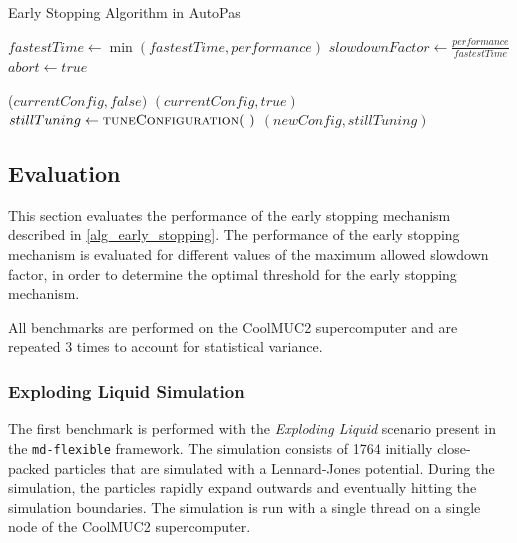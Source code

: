 \documentclass[conference]{IEEEtran}
\begin{document}
\begin{algorithm}[H]
    \small
    \caption{Early Stopping Algorithm in AutoPas}
    \label{alg_early_stopping}
    \begin{algorithmic}[1]
        \State $fastestTime \gets \min(fastestTime, performance)$
        \State $slowdownFactor \gets \frac{performance}{fastestTime}$
        \State $abort \gets true$
        \EndIf
        \EndProcedure

        \vspace{0.5em}

        \State \Return ($currentConfig, false)$
            \State \Return $(currentConfig, true)$
            \Else
            \State $stillTuning \gets \Call{tuneConfiguration}{~}$
            \State \Return $(newConfig, stillTuning)$
        \EndIf
        \EndProcedure
    \end{algorithmic}

\end{algorithm}



\subsection{Evaluation}
\label{sec:evaluation}

This section evaluates the performance of the early stopping mechanism described in \autoref{alg_early_stopping}. The performance of the early stopping mechanism is evaluated for different values of the maximum allowed slowdown factor, in order to determine the optimal threshold for the early stopping mechanism.

All benchmarks are performed on the CoolMUC2 supercomputer  and are repeated 3 times to account for statistical variance.

\subsubsection{Exploding Liquid Simulation}

The first benchmark is performed with the \textit{Exploding Liquid} scenario present in the \texttt{md-flexible} framework. The simulation consists of 1764 initially close-packed particles that are simulated with a Lennard-Jones potential. During the simulation, the particles rapidly expand outwards and eventually hitting the simulation boundaries. The simulation is run with a single thread on a single node of the CoolMUC2 supercomputer.
\end{document}
